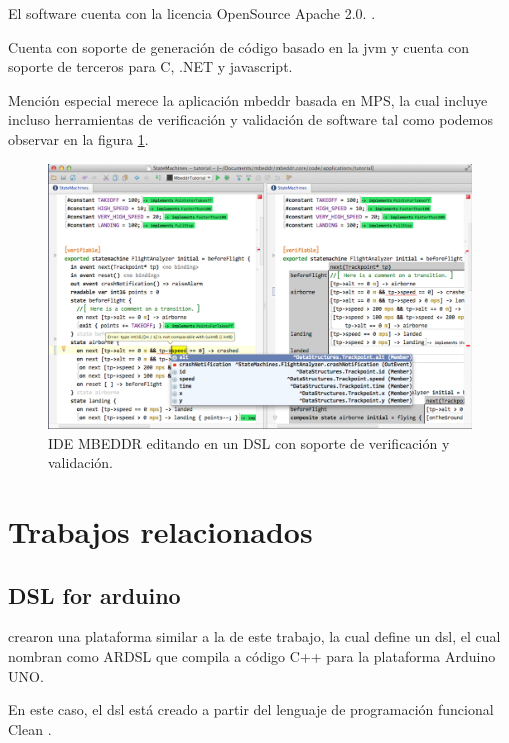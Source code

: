 El software cuenta con la licencia OpenSource Apache 2.0. \cite{mps_licencia}.


Cuenta con soporte de generación de código basado en la \gls{jvm} y cuenta con soporte de terceros para C, .NET y javascript.

Mención especial merece la aplicación mbeddr \cite{mbeddr} basada en MPS,  la cual incluye incluso herramientas de  verificación y validación de software tal como podemos observar en la figura  \ref{fig:mbeddr_editor_dsl}.

\begin{figure}
	\centering
    \includegraphics[height=0.3\textheight]{images/estado_cuestion/mbeddr_editor.png}
    \caption[IDE MBEDDR]{IDE MBEDDR editando en un DSL con soporte de verificación y validación.}
    \label{fig:mbeddr_editor_dsl}
\end{figure}




\section{Trabajos relacionados}

\subsection{DSL for arduino}

\textcite{shallow_embedded_dsl_arduino} crearon una plataforma similar a la de este trabajo, la cual define un \gls{dsl}, el cual nombran como ARDSL que compila a código C++ para la plataforma Arduino UNO.

En este caso, el \gls{dsl} está creado a partir del lenguaje de programación funcional Clean \cite{clean_lang}.

